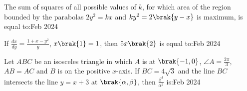       
    \item The sum of squares of all possible values of $k$, for which area of the region bounded by the parabolas $2y^{2}=kx$ and $ky^{2}=2\brak{y-x}$ is maximum, is equal to:\hfill{Feb 2024}

       
    \item If $\frac{dx}{dy}=\frac{1+x-y^{2}}{y}$, $x\brak{1}=1$, then $5x\brak{2}$ is equal to:\hfill{Feb 2024}


    \item Let $ABC$ be an isosceles triangle in which $A$ is at $\brak{-1,0}$, $\angle A=\frac{2\pi}{3}$, $AB=AC$ and $B$ is on the positive $x$-axis. If $BC=4\sqrt{3}$ and the line $BC$ intersects the line $y=x+3$ at $\brak{\alpha,\beta}$, then $\frac{\beta^{4}}{\alpha^{2}}$ is:\hfill{Feb 2024}
